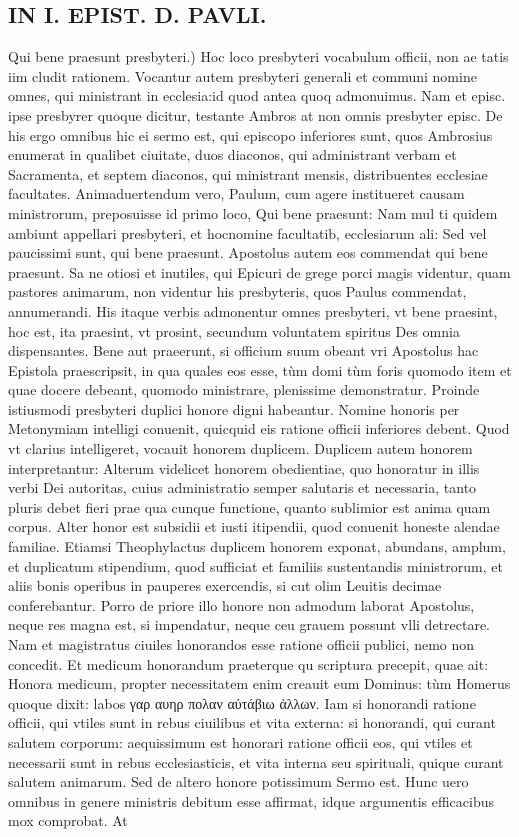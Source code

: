 \documentclass{article}
\begin{document}
\begin{pages}
\section*{IN I. EPIST. D. PAVLI. }
\marginpar{[ p.112 ]}\pstart Qui bene praesunt presbyteri.) Hoc loco presbyteri vocabulum officii, non ae tatis iim cludit rationem. Vocantur autem presbyteri generali et communi nomine omnes, qui ministrant in ecclesia:id quod antea quoq admonuimus. Nam et episc. ipse presbyrer quoque dicitur, testante Ambros at non omnis presbyter episc. De his ergo omnibus hic ei sermo est, qui episcopo inferiores sunt, quos Ambrosius enumerat in qualibet ciuitate, duos diaconos, qui administrant verbam et Sacramenta, et septem diaconos, qui ministrant mensis, distribuentes ecclesiae facultates. Animaduertendum vero, Paulum, cum agere institueret causam ministrorum, preposuisse id primo loco, Qui bene praesunt: Nam mul ti quidem ambiunt appellari presbyteri, et hocnomine facultatib, ecclesiarum ali: Sed vel paucissimi sunt, qui bene praesunt. Apostolus autem eos commendat qui bene praesunt. Sa ne otiosi et inutiles, qui Epicuri de grege porci magis videntur, quam pastores animarum, non videntur his presbyteris, quos Paulus commendat, annumerandi. His itaque verbis admonentur omnes presbyteri, vt bene praesint, hoc est, ita praesint, vt prosint, secundum voluntatem spiritus Des omnia dispensantes. Bene aut praeerunt, si officium suum obeant vri Apostolus hac Epistola praescripsit, in qua quales eos esse, tùm domi tùm foris quomodo item et quae docere debeant, quomodo ministrare, plenissime demonstratur. Proinde istiusmodi presbyteri duplici honore digni habeantur. Nomine honoris per Metonymiam intelligi conuenit, quicquid eis ratione officii inferiores debent. Quod vt clarius intelligeret, vocauit honorem duplicem. Duplicem autem honorem interpretantur: Alterum videlicet honorem obedientiae, quo honoratur in illis verbi Dei autoritas, cuius administratio semper salutaris et necessaria, tanto pluris debet fieri prae qua cunque functione, quanto sublimior est anima quam corpus. Alter honor est subsidii et iusti itipendii, quod conuenit honeste alendae familiae. Etiamsi Theophylactus duplicem honorem exponat, abundans, amplum, et duplicatum stipendium, quod sufficiat et familiis sustentandis ministrorum, et aliis bonis operibus in pauperes exercendis, si cut olim Leuitis decimae conferebantur. Porro de priore illo honore non admodum laborat Apostolus, neque res magna est, si impendatur, neque ceu grauem possunt vlli detrectare. Nam et magistratus ciuiles honorandos esse ratione officii publici, nemo non concedit. Et medicum honorandum praeterque qu scriptura precepit, quae ait: Honora medicum, propter necessitatem enim creauit eum Dominus: tùm Homerus quoque dixit: labos γαρ αυηρ πολαν αὐτάβιω ἀλλων. Iam si honorandi ratione officii, qui vtiles sunt in rebus ciuilibus et vita externa: si honorandi, qui curant salutem corporum: aequissimum est honorari ratione officii eos, qui vtiles et necessarii sunt in rebus ecclesiasticis, et vita interna seu spirituali, quique curant salutem animarum. Sed de altero honore potissimum Sermo est. Hunc uero omnibus in genere ministris debitum esse affirmat, idque argumentis efficacibus mox comprobat. At 
\end{pages}
\end{document}
